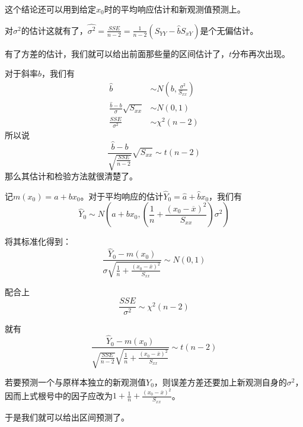 这个结论还可以用到给定$x_0$时的平均响应估计和新观测值预测上。

对$\sigma^2$的估计这就有了，$\hat{\sigma^2}=\frac{SSE}{n-2}=\frac{1}{n-2}(S_{YY}-\hat{b}S_{xY})$是个无偏估计。

有了方差的估计，我们就可以给出前面那些量的区间估计了，$t$分布再次出现。

对于斜率$b$，我们有
\begin{align*}
\hat{b}&\sim N(b,\frac{\sigma^2}{S_{xx}})\\
\frac{\hat{b}-b}{\sigma}\sqrt{S_{xx}} &\sim N(0,1)\\
\frac{SSE}{\sigma^2} &\sim \chi^2(n-2)
\end{align*}
所以说
\[
\frac{\hat{b}-b}{\sqrt{\frac{SSE}{n-2}}}\sqrt{S_{xx}}\sim t(n-2)
\]
那么其估计和检验方法就很清楚了。

记$m(x_0)=a+bx_0$。对于平均响应的估计$\hat{Y}_0=\hat a+\hat b x_0$，我们有
\[
\hat{Y}_0 \sim N\left(a+bx_0,\left(\frac{1}{n}+\frac{(x_0-\overline{x})^2}{S_{xx}}\right)\sigma^2\right)
\]

将其标准化得到：
\[
\frac{\hat{Y}_0-m(x_0)}{\sigma\sqrt{\frac{1}{n}+\frac{(x_0-\overline{x})^2}{S_{xx}}}} \sim N(0,1)
\]

配合上
\[
\frac{SSE}{\sigma^2} \sim \chi^2(n-2)
\]

就有
\[
\frac{\hat{Y}_0-m(x_0)}{\sqrt{\frac{SSE}{n-2}}\sqrt{\frac{1}{n}+\frac{(x_0-\overline{x})^2}{S_{xx}}}} \sim t(n-2)
\]

若要预测一个与原样本独立的新观测值$Y_0$，则误差方差还要加上新观测自身的$\sigma^2$，因而上式根号中的因子应改为$1+\frac1n+\frac{(x_0-\overline{x})^2}{S_{xx}}$。

于是我们就可以给出区间预测了。
